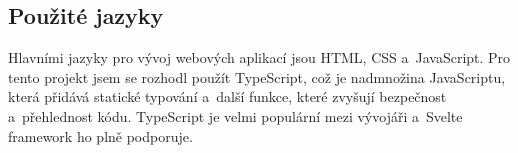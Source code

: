 \subsection{Použité jazyky}
Hlavními jazyky pro vývoj webových aplikací jsou HTML, CSS a~JavaScript. Pro tento projekt jsem se rozhodl použít TypeScript, což je nadmnožina JavaScriptu, která přidává statické typování a~další funkce, které zvyšují bezpečnost a~přehlednost kódu. TypeScript je velmi populární mezi vývojáři a~Svelte framework ho plně podporuje.